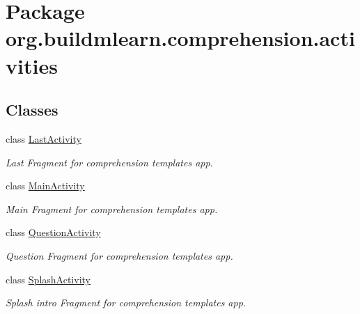\hypertarget{namespaceorg_1_1buildmlearn_1_1comprehension_1_1activities}{}\section{Package org.\+buildmlearn.\+comprehension.\+activities}
\label{namespaceorg_1_1buildmlearn_1_1comprehension_1_1activities}
\subsection*{Classes}
\begin{DoxyCompactItemize}
\item 
class \hyperlink{classorg_1_1buildmlearn_1_1comprehension_1_1activities_1_1LastActivity}{Last\+Activity}
\begin{DoxyCompactList}\small\item\em Last Fragment for comprehension template\textquotesingle{}s app. \end{DoxyCompactList}\item 
class \hyperlink{classorg_1_1buildmlearn_1_1comprehension_1_1activities_1_1MainActivity}{Main\+Activity}
\begin{DoxyCompactList}\small\item\em Main Fragment for comprehension template\textquotesingle{}s app. \end{DoxyCompactList}\item 
class \hyperlink{classorg_1_1buildmlearn_1_1comprehension_1_1activities_1_1QuestionActivity}{Question\+Activity}
\begin{DoxyCompactList}\small\item\em Question Fragment for comprehension template\textquotesingle{}s app. \end{DoxyCompactList}\item 
class \hyperlink{classorg_1_1buildmlearn_1_1comprehension_1_1activities_1_1SplashActivity}{Splash\+Activity}
\begin{DoxyCompactList}\small\item\em Splash intro Fragment for comprehension template\textquotesingle{}s app. \end{DoxyCompactList}\end{DoxyCompactItemize}
